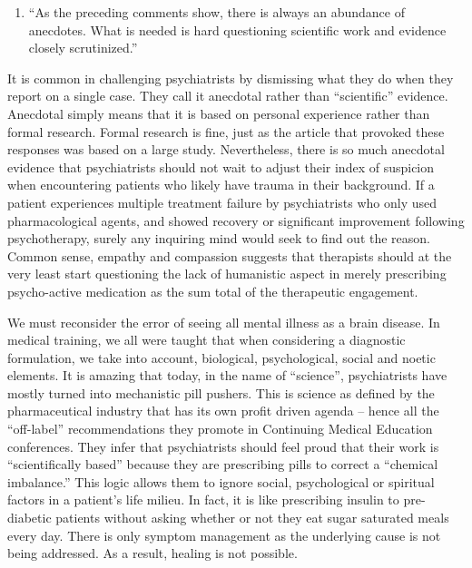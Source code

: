 \documentclass[]{book}
\providecommand{\tightlist}{%
  \setlength{\itemsep}{0pt}\setlength{\parskip}{0pt}}
\begin{document}
\begin{enumerate}
\def\labelenumi{\arabic{enumi}.}
\setcounter{enumi}{3}
\tightlist
\item
  ``As the preceding comments show, there is always an abundance of anecdotes. What is needed is hard questioning scientific work and evidence closely scrutinized.''
\end{enumerate}

It is common in challenging psychiatrists by dismissing what they do when they report on a single case. They call it anecdotal rather than ``scientific'' evidence. Anecdotal simply means that it is based on personal experience rather than formal research. Formal research is fine, just as the article that provoked these responses was based on a large study. Nevertheless, there is so much anecdotal evidence that psychiatrists should not wait to adjust their index of suspicion when encountering patients who likely have trauma in their background. If a patient experiences multiple treatment failure by psychiatrists who only used pharmacological agents, and showed recovery or significant improvement following psychotherapy, surely any inquiring mind would seek to find out the reason. Common sense, empathy and compassion suggests that therapists should at the very least start questioning the lack of humanistic aspect in merely prescribing psycho-active medication as the sum total of the therapeutic engagement.

We must reconsider the error of seeing all mental illness as a brain disease. In medical training, we all were taught that when considering a diagnostic formulation, we take into account, biological, psychological, social and noetic elements. It is amazing that today, in the name of ``science'', psychiatrists have mostly turned into mechanistic pill pushers. This is science as defined by the pharmaceutical industry that has its own profit driven agenda -- hence all the ``off-label'' recommendations they promote in Continuing Medical Education conferences. They infer that psychiatrists should feel proud that their work is ``scientifically based'' because they are prescribing pills to correct a ``chemical imbalance.'' This logic allows them to ignore social, psychological or spiritual factors in a patient's life milieu. In fact, it is like prescribing insulin to pre-diabetic patients without asking whether or not they eat sugar saturated meals every day. There is only symptom management as the underlying cause is not being addressed. As a result, healing is not possible.
\end{document}
